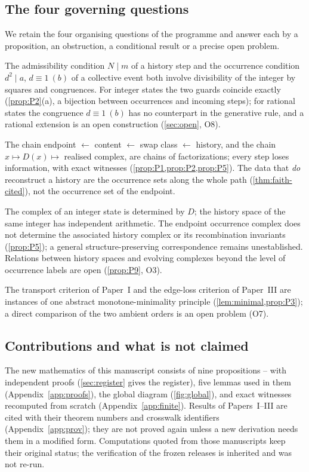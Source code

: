 \subsection{The four governing questions}
We retain the four organising questions of the programme and answer each by a proposition, an obstruction, a conditional result or a precise open problem.
\begin{description}[leftmargin=1.2em,itemsep=2pt]
\item[S1 (common guards).] The admissibility condition $N\mid m$ of a history step and the occurrence condition $d^2\mid a$, $d\equiv1\ (b)$ of a collective event both involve divisibility of the integer by squares and congruences. For integer states the two guards coincide exactly (\cref{prop:P2}(a), a bijection between occurrences and incoming steps); for rational states the congruence $d\equiv1\ (b)$ has no counterpart in the generative rule, and a rational extension is an open construction (\cref{sec:open}, O8).
\item[S2 (information lost by projection).] The chain endpoint $\leftarrow$ content $\leftarrow$ swap class $\leftarrow$ history, and the chain $x\mapsto D(x)\mapsto$ realised complex, are chains of factorizations; every step loses information, with exact witnesses (\cref{prop:P1,prop:P2,prop:P5}). The data that \emph{do} reconstruct a history are the occurrence sets along the whole path (\cref{thm:faith-cited}), not the occurrence set of the endpoint.
\item[S3 (geometry across spaces).] The complex of an integer state is determined by $D$; the history space of the same integer has independent arithmetic. The endpoint occurrence complex does not determine the associated history complex or its recombination invariants (\cref{prop:P5}); a general structure-preserving correspondence remains unestablished. Relations between history spaces and evolving complexes beyond the level of occurrence labels are open (\cref{prop:P9}, O3).
\item[S4 (boundaries and events).] The transport criterion of Paper~I and the edge-loss criterion of Paper~III are instances of one abstract monotone-minimality principle (\cref{lem:minimal,prop:P3}); a direct comparison of the two ambient orders is an open problem (O7).
\end{description}

\subsection{Contributions and what is not claimed}
The new mathematics of this manuscript consists of nine propositions -- with independent proofs (\cref{sec:register} gives the register), five lemmas used in them (Appendix~\ref{app:proofs}), the global diagram (\cref{fig:global}), and exact witnesses recomputed from scratch (Appendix~\ref{app:finite}). Results of Papers~I--III are cited with their theorem numbers and crosswalk identifiers (Appendix~\ref{app:prov}); they are not proved again unless a new derivation needs them in a modified form. Computations quoted from those manuscripts keep their original status; the verification of the frozen releases is inherited and was not re-run.

